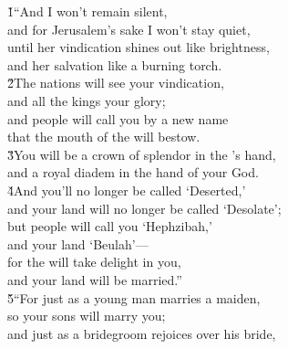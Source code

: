 \begin{poetry}
\poeml {}
\v{1}``And I won't remain silent, \\
\poemll    and for Jerusalem's sake I won't stay quiet, \\
\poeml until her vindication shines out like brightness, \\
\poemll    and her salvation like a burning torch. \\
\poeml \v{2}The nations will see your vindication, \\
\poemll    and all the kings your glory; \\
\poeml and people will call you by a new name \\
\poemll    that the mouth of the  will bestow. \\
\poeml \v{3}You will be a crown of splendor in the 's hand, \\
\poemll    and a royal diadem in the hand of your God. \\
\poeml \v{4}And you'll no longer be called `Deserted,' \\
\poemll    and your land will no longer be called `Desolate'; \\
\poeml but people will call you `Hephzibah,' \\
\poemll    and your land `Beulah'--- \\
\poeml for the  will take delight in you, \\
\poemll    and your land will be married.'' \\
\poeml \v{5}``For just as a young man marries a maiden, \\
\poemll    so your sons will marry you; \\
\poeml and just as a bridegroom rejoices over his bride, \\

\end{poetry}
